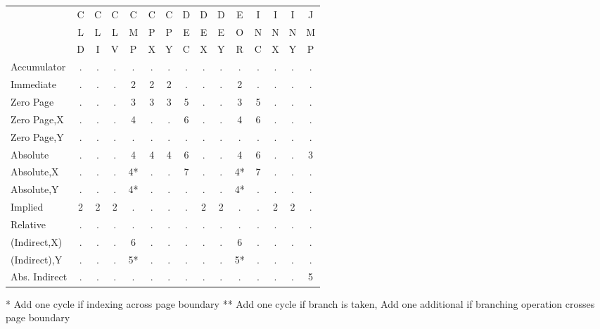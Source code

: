 \documentclass{article}
\begin{document}
  \begin{table}[H]
  \centering
  \begin{tabular}{|l|c c c c c c c c c c c c c c|}
  \hline
               &  C & C & C & C & C & C & D & D & D & E & I & I & I & J\\
               &  L & L & L & M & P & P & E & E & E & O & N & N & N & M\\
               &  D & I & V & P & X & Y & C & X & Y & R & C & X & Y & P\\
  \hline
  Accumulator  &  . & . & . & . & . & . & . & . & . & . & . & . & . & .\\
  Immediate    &  . & . & . & 2 & 2 & 2 & . & . & . & 2 & . & . & . & .\\
  Zero Page    &  . & . & . & 3 & 3 & 3 & 5 & . & . & 3 & 5 & . & . & .\\
  Zero Page,X  &  . & . & . & 4 & . & . & 6 & . & . & 4 & 6 & . & . & .\\
  Zero Page,Y  &  . & . & . & . & . & . & . & . & . & . & . & . & . & .\\
  Absolute     &  . & . & . & 4 & 4 & 4 & 6 & . & . & 4 & 6 & . & . & 3\\
  Absolute,X   &  . & . & . & 4*& . & . & 7 & . & . & 4*& 7 & . & . & .\\
  Absolute,Y   &  . & . & . & 4*& . & . & . & . & . & 4*& . & . & . & .\\
  Implied      &  2 & 2 & 2 & . & . & . & . & 2 & 2 & . & . & 2 & 2 & .\\
  Relative     &  . & . & . & . & . & . & . & . & . & . & . & . & . & .\\
  (Indirect,X) &  . & . & . & 6 & . & . & . & . & . & 6 & . & . & . & .\\
  (Indirect),Y &  . & . & . & 5*& . & . & . & . & . & 5*& . & . & . & .\\
  Abs. Indirect&  . & . & . & . & . & . & . & . & . & . & . & . & . & 5\\
  \hline
  \end{tabular}
  \end{table}
     *  Add one cycle if indexing across page boundary
     ** Add one cycle if branch is taken, Add one additional if branching
        operation crosses page boundary
\end{document}
